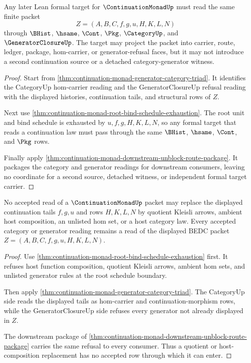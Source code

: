 \begin{theorem}
\label{thm:continuation-monad-formal-target-handoff}
Any later Lean formal target for $\ContinuationMonadUp$ must read the same finite packet
$$
Z=(A,B,C,f,g,u,H,K,L,N)
$$
through $\BHist$, $\hsame$, $\Cont$, $\Pkg$, $\CategoryUp$, and $\GeneratorClosureUp$. The target may project the packet into carrier, route, ledger, package, hom-carrier, or generator-refusal faces, but it may not introduce a second continuation source or a detached category-generator witness.
\end{theorem}
\begin{proof}
Start from \autoref{thm:continuation-monad-generator-category-triad}. It identifies the CategoryUp hom-carrier reading and the GeneratorClosureUp refusal reading with the displayed histories, continuation tails, and structural rows of $Z$.

Next use \autoref{thm:continuation-monad-root-bind-schedule-exhaustion}. The root unit and bind schedule is exhausted by $u,f,g,H,K,L,N$, so any formal target that reads a continuation law must pass through the same $\BHist$, $\hsame$, $\Cont$, and $\Pkg$ rows.

Finally apply \autoref{thm:continuation-monad-downstream-unblock-route-package}. It packages the category and generator readings for downstream consumers, leaving no coordinate for a second source, detached witness, or independent formal target carrier.
\end{proof}

\begin{theorem}
\label{thm:continuation-monad-kleisli-quotient-refusal}
No accepted read of a $\ContinuationMonadUp$ packet may replace the displayed continuation tails $f,g,u$ and rows $H,K,L,N$ by quotient Kleisli arrows, ambient host composition, an unlisted hom set, or a host category law. Every accepted category or generator reading remains a read of the displayed BEDC packet $Z=(A,B,C,f,g,u,H,K,L,N)$.
\end{theorem}
\begin{proof}
Use \autoref{thm:continuation-monad-root-bind-schedule-exhaustion} first. It refuses host function composition, quotient Kleisli arrows, ambient hom sets, and unlisted generator rules at the root schedule boundary.

Then apply \autoref{thm:continuation-monad-generator-category-triad}. The CategoryUp side reads the displayed tails as hom-carrier and continuation-morphism rows, while the GeneratorClosureUp side refuses every generator not already displayed in $Z$.

The downstream package of \autoref{thm:continuation-monad-downstream-unblock-route-package} carries the same refusal to every consumer. Thus a quotient or host-composition replacement has no accepted row through which it can enter.
\end{proof}

